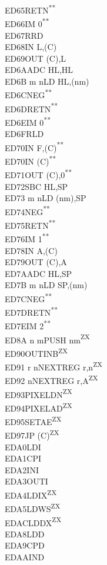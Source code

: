 \documentclass[12pt,twoside,openright,a4paper]{book}
\newcommand{\UNDOC}{\textnormal{\textsuperscript{**}}}
\newcommand{\ZXN}{\textnormal{\textsuperscript{ZX}}}
\begin{document}
\begin{multicols}{3}
{\begin{tabbing}
	ED65\>RETN\UNDOC\\
	ED66\>IM 0\UNDOC\\
	ED67\>RRD\\
	ED68\>IN L,(C)\\
	ED69\>OUT (C),L\\
	ED6A\>ADC HL,HL\\
	ED6B m n\>LD HL,(nm)\\
	ED6C\>NEG\UNDOC\\
	ED6D\>RETN\UNDOC\\
	ED6E\>IM 0\UNDOC\\
	ED6F\>RLD\\
	ED70\>IN F,(C)\UNDOC\\
	ED70\>IN (C)\UNDOC\\
	ED71\>OUT (C),0\UNDOC\\
	ED72\>SBC HL,SP\\
	ED73 m n\>LD (nm),SP\\
	ED74\>NEG\UNDOC\\
	ED75\>RETN\UNDOC\\
	ED76\>IM 1\UNDOC\\
	ED78\>IN A,(C)\\
	ED79\>OUT (C),A\\
	ED7A\>ADC HL,SP\\
	ED7B m n\>LD SP,(nm)\\
	ED7C\>NEG\UNDOC\\
	ED7D\>RETN\UNDOC\\
	ED7E\>IM 2\UNDOC\\
	ED8A n m\>PUSH nm\ZXN\\
	ED90\>OUTINB\ZXN\\
	ED91 r n\>NEXTREG r,n\ZXN\\
	ED92 n\>NEXTREG r,A\ZXN\\
	ED93\>PIXELDN\ZXN\\
	ED94\>PIXELAD\ZXN\\
	ED95\>SETAE\ZXN\\
	ED97\>JP (C)\ZXN\\
	EDA0\>LDI\\
	EDA1\>CPI\\
	EDA2\>INI\\
	EDA3\>OUTI\\
	EDA4\>LDIX\ZXN\\
	EDA5\>LDWS\ZXN\\
	EDAC\>LDDX\ZXN\\
	EDA8\>LDD\\
	EDA9\>CPD\\
	EDAA\>IND\\

\end{tabbing}}
\end{multicols}
\end{document}
